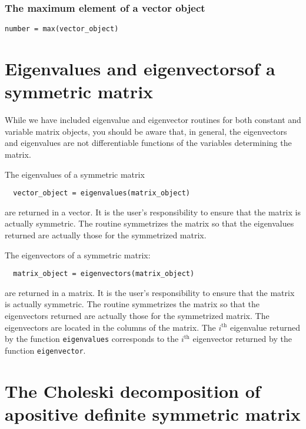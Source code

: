 \documentclass{admbmanual}
\begin{document}
\subsubsection{The maximum element of a vector object}
\begin{lstlisting}
number = max(vector_object)
\end{lstlisting}
\bigskip

\section{Eigenvalues and eigenvectors\br of a symmetric matrix}

While we have included eigenvalue and eigenvector routines for both constant and
variable matrix objects, you should be aware that, in general, the eigenvectors
and eigenvalues are not differentiable functions of the variables determining
the matrix.

The eigenvalues of a symmetric matrix
\begin{lstlisting}
  vector_object = eigenvalues(matrix_object)
\end{lstlisting}
are returned in a vector. It is the user's responsibility to ensure that the
matrix is actually symmetric. The routine symmetrizes the matrix so that the
eigenvalues returned are actually those for the symmetrized matrix.

The eigenvectors of a symmetric matrix:
\begin{lstlisting}
  matrix_object = eigenvectors(matrix_object)
\end{lstlisting}
are returned in a matrix. It is the user's responsibility to ensure that the
matrix is actually symmetric. The routine symmetrizes the matrix so that the
eigenvectors returned are actually those for the symmetrized matrix. The
eigenvectors are located in the columns of the matrix. The $i^\textrm{th}$
eigenvalue returned by the function \texttt{eigenvalues} corresponds to the
$i^\textrm{th}$ eigenvector returned by the function \texttt{eigenvector}.


\section{The Choleski decomposition of a\br positive definite symmetric matrix}
\end{document}
